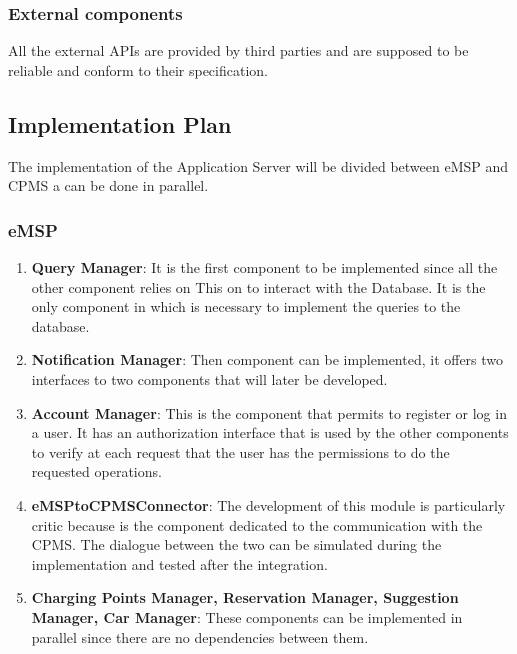 \subsubsection{External components} 
All the external APIs are provided by third parties and are supposed to be reliable and conform to their specification. 

\subsection{Implementation Plan}
The implementation of the Application Server will be divided between eMSP and CPMS a can be done in parallel.
\subsubsection{eMSP}
\begin{enumerate}
    \item \textbf{Query Manager}: It is the first component to be implemented since all the other component relies on This
    on to interact with the Database. It is the only component in which is necessary to implement the queries to the database.
    \item \textbf{Notification Manager}: Then component can be implemented, it offers two interfaces to two components that will later 
    be developed.
    \item \textbf{Account Manager}: This is the component that permits to register or log in a user. It has an authorization interface that 
    is used by the other components to verify at each request that the user has the permissions to do the requested operations.
    \item \textbf{eMSPtoCPMSConnector}: The development of this module is particularly critic because is the component dedicated
    to the communication with the CPMS. The dialogue between the two can be simulated during the implementation and tested after the integration.
    \item \textbf{Charging Points Manager, Reservation Manager, Suggestion Manager, Car Manager}: These components can be implemented
    in parallel since there are no dependencies between them. 
\end{enumerate}

